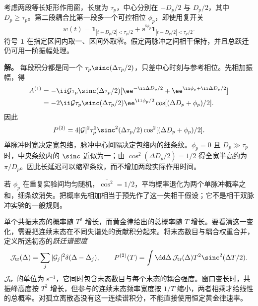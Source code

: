 \begin{exbox}
考虑两段等长矩形作用窗，长度为 $\tau_p$，中心分别在 $-D_p/2$ 与 $D_p/2$，其中 $D_p\ge\tau_p$。第二段耦合比第一段多一个可控相位 $\phi_p$，即使用复开关
\begin{equation*}
 w(t)=\mathbf1_{|t+D_p/2|<\tau_p/2}
       +\ee^{\ii\phi_p}\mathbf1_{|t-D_p/2|<\tau_p/2}.
\end{equation*}
符号 $\mathbf1$ 在指定区间内取一、区间外取零。假定两脉冲之间相干保持，并且总跃迁仍可用一阶振幅处理。

\textbf{解。} 每段积分都是同一个 $\tau_p\sinc(\Delta\tau_p/2)$，只差中心时刻与参考相位。先相加振幅，得
\begin{align*}
 A^{(1)}&=-\ii\mathcal G\tau_p\sinc(\Delta\tau_p/2)
 [\ee^{-\ii\Delta D_p/2}+\ee^{\ii\phi_p+\ii\Delta D_p/2}]\\
 &=-2\ii\mathcal G\tau_p\sinc(\Delta\tau_p/2)
 \ee^{\ii\phi_p/2}\cos[(\Delta D_p+\phi_p)/2].
\end{align*}
因此
\begin{equation*}
 P^{(2)}=4|\mathcal G|^2\tau_p^2\sinc^2(\Delta\tau_p/2)
 \cos^2[(\Delta D_p+\phi_p)/2].
\end{equation*}
单脉冲时宽决定宽包络，脉冲中心间隔决定包络内的细条纹。$\phi_p=0$ 且 $D_p\gg\tau_p$ 时，中央条纹内的 $\sinc$ 近似为一；由 $\cos^2(\Delta D_p/2)=1/2$ 得全宽半高约为 $\pi/D_p$。因此长延迟可以缩窄条纹，而不增加两段实际作用时间。

若 $\phi_p$ 在重复实验间均匀随机，$\overline{\cos^2}=1/2$，平均概率退化为两个单脉冲概率之和，细条纹消失。把概率先相加相当于预先作了这一失相干假设；它不是相干双脉冲实验的一般规则。
\end{exbox}

单个共振末态的概率随 $T^2$ 增长，而黄金律给出的总概率随 $T$ 增长。要看清这一变化，需要把连续末态在不同失谐处的贡献积分起来。将末态数目与耦合权重合并，定义所选初态的\emph{跃迁谱密度}
\begin{equation}
 \mathcal J_{\rm tr}(\Delta)=\sum_j|\mathcal G_j|^2\delta(\Delta-\Delta_j),\qquad
 P^{(2)}(T)=\int\dd\Delta\,\mathcal J_{\rm tr}(\Delta)
 T^2\sinc^2(\Delta T/2).
 \label{eq:electron-window-transition-spectrum}
\end{equation}
$\mathcal J_{\rm tr}$ 的单位为 $\mathrm{s^{-1}}$，它同时包含末态数目与每个末态的耦合强度。窗口变长时，共振峰高度按 $T^2$ 增长，但参与的连续末态频率宽度按 $1/T$ 缩小，两者相乘才给线性的总概率。对孤立离散态没有这一连续谱积分，不能直接使用恒定黄金律速率。

